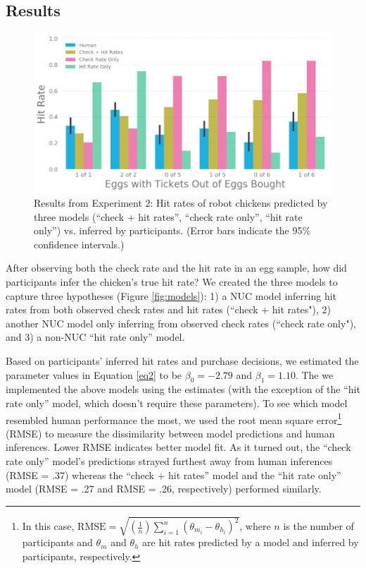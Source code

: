 \documentclass[10pt,letterpaper]{article}
\begin{document}
\subsection{Results} 
\begin{figure}[t]
  \includegraphics[width=\linewidth]{exp2.png}
  \caption{Results from Experiment 2: Hit rates of robot chickens predicted by three models (``check + hit rates'', ``check rate only'', ``hit rate only'') vs. inferred by participants. (Error bars indicate the 95\% confidence intervals.)}
  \label{fig:exp2}
\end{figure}

After observing both the check rate and the hit rate in an egg sample, how did participants infer the chicken's true hit rate? We created the three models to capture three hypotheses (Figure \ref{fig:models}): 1) a NUC model inferring hit rates from both observed check rates and hit rates (``check + hit rates"), 2) another NUC model only inferring from observed check rates (``check rate only"), and 3) a non-NUC ``hit rate only'' model.

Based on participants' inferred hit rates and purchase decisions, we estimated the parameter values in Equation \ref{eq2} to be $\beta_0 = -2.79$ and $\beta_1 = 1.10$. The we implemented the above models using the estimates (with the exception of the ``hit rate only'' model, which doesn't require these parameters). To see which model resembled human performance the most, we used the root mean square error\footnote{In this case, $\mathrm{RMSE} = \sqrt{(\frac{1}{n})\sum_{i=1}^{n}(\theta_{m_{i}} - \theta_{h_{i}})^{2}}$, where $n$ is the number of participants and $\theta_{m}$ and $\theta_{h}$ are hit rates predicted by a model and inferred by participants, respectively.} (RMSE) to measure the dissimilarity between model predictions and human inferences. Lower RMSE indicates better model fit. As it turned out, the ``check rate only'' model's predictions strayed furthest away from human inferences (RMSE = .37) whereas the ``check + hit rates'' model and the ``hit rate only'' model (RMSE = .27 and RMSE = .26, respectively) performed similarly. 
\end{document}
